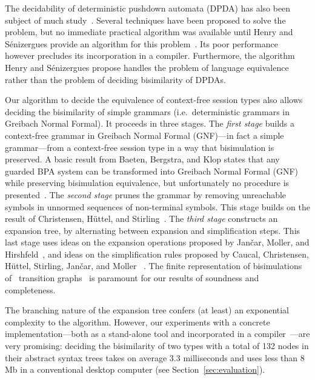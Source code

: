 
The decidability of deterministic pushdown automata (DPDA) has also been
subject of much
study~\cite{janvcar2008selected,senizergues1997equivalence,stirling2001decidability}.
Several techniques have been proposed to solve the problem, but no
immediate practical algorithm was available until Henry and
Sénizergues provide an algorithm for this
problem~\cite{henry2013lalblc}. Its poor performance however precludes
its incorporation in a compiler.
Furthermore, the algorithm Henry and
Sénizergues propose handles the problem of language equivalence rather than
the problem of deciding bisimilarity of DPDAs.

Our algorithm to decide the equivalence of context-free session types
also allows deciding the bisimilarity of simple grammars (i.e.\
deterministic grammars in Greibach Normal Formal).  It proceeds in
three stages.
%
The \emph{first stage} builds a context-free grammar in Greibach
Normal Formal (GNF)---in fact a simple grammar---from a context-free
session type in a way that bisimulation is preserved.  A basic result
from Baeten, Bergstra, and Klop states that any guarded BPA system can
be transformed into Greibach Normal Formal (GNF) while preserving
bisimulation equivalence, but unfortunately no procedure is
presented~\cite{baeten1993decidability}.
%
The \emph{second stage} prunes the grammar by removing unreachable
symbols in unnormed sequences of non-terminal symbols. This stage
builds on the result of Christensen, H\"uttel, and 
Stirling~\cite{DBLP:journals/iandc/ChristensenHS95}.
%
The \emph{third stage} constructs an expansion tree, by alternating
between expansion and simplification steps.  This last stage uses
ideas on the expansion operations proposed by Jan\v car, Moller, and
Hirshfeld~\cite{hirshfeld1996bisimulation,janvcar1999techniques}, and
ideas on the simplification rules proposed by Caucal, Christensen,
H\"uttel, Stirling, Jan\v car, and Moller
~\cite{caucal1986decidabilite,DBLP:journals/iandc/ChristensenHS95,janvcar1999techniques}.
The finite representation of bisimulations of \BPA\ transition
graphs~\cite{caucal1986decidabilite,DBLP:journals/iandc/ChristensenHS95}
is paramount for our results of soundness and completeness.


The branching nature of the expansion tree confers (at least) an
exponential complexity to the algorithm.
%
However, our experiments with a concrete implementation---both as a
stand-alone tool and incorporated in a
compiler~\cite{almeida.etal_freest-functional-language}---are very
promising: deciding the bisimilarity of two types with a total of 132
nodes in their abstract syntax trees takes on average 3.3
milliseconds and uses less than 8 Mb in a conventional desktop
computer (see Section~\ref{sec:evaluation}).

